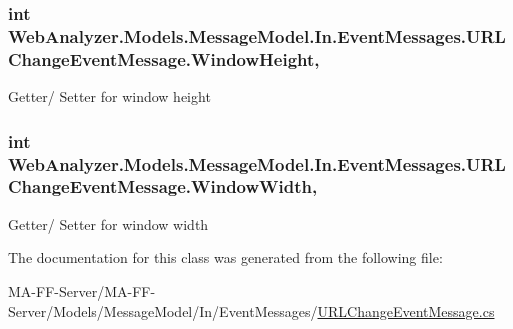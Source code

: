 \subsubsection[{Window\+Height}]{\setlength{\rightskip}{0pt plus 5cm}int Web\+Analyzer.\+Models.\+Message\+Model.\+In.\+Event\+Messages.\+U\+R\+L\+Change\+Event\+Message.\+Window\+Height\hspace{0.3cm}{\ttfamily [get]}, {\ttfamily [set]}}\label{class_web_analyzer_1_1_models_1_1_message_model_1_1_in_1_1_event_messages_1_1_u_r_l_change_event_message_a38465c15df5836ce5f4852a6e749a9fd}


Getter/ Setter for window height 

\hypertarget{class_web_analyzer_1_1_models_1_1_message_model_1_1_in_1_1_event_messages_1_1_u_r_l_change_event_message_abd2bd1ae084ffc2aecf7daf1f50c5b77}{}
\subsubsection[{Window\+Width}]{\setlength{\rightskip}{0pt plus 5cm}int Web\+Analyzer.\+Models.\+Message\+Model.\+In.\+Event\+Messages.\+U\+R\+L\+Change\+Event\+Message.\+Window\+Width\hspace{0.3cm}{\ttfamily [get]}, {\ttfamily [set]}}\label{class_web_analyzer_1_1_models_1_1_message_model_1_1_in_1_1_event_messages_1_1_u_r_l_change_event_message_abd2bd1ae084ffc2aecf7daf1f50c5b77}


Getter/ Setter for window width 



The documentation for this class was generated from the following file\+:\begin{DoxyCompactItemize}
\item 
M\+A-\/\+F\+F-\/\+Server/\+M\+A-\/\+F\+F-\/\+Server/\+Models/\+Message\+Model/\+In/\+Event\+Messages/\hyperlink{_u_r_l_change_event_message_8cs}{U\+R\+L\+Change\+Event\+Message.\+cs}\end{DoxyCompactItemize}
